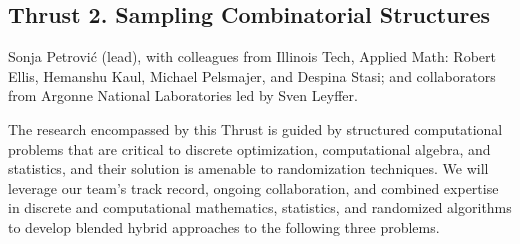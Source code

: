 \documentclass[11pt]{NSFamsart}
\begin{document}

\subsection*{Thrust 2. Sampling Combinatorial Structures} 
 Sonja Petrovi\'c (lead),  with colleagues from Illinois Tech, Applied Math: 
 Robert Ellis,
  Hemanshu Kaul, %
 Michael Pelsmajer, %
and  Despina Stasi; %
and collaborators from Argonne National Laboratories led by Sven Leyffer.  

The research encompassed by this Thrust  is guided by 
structured  computational problems that are critical to discrete optimization, computational algebra, and statistics, and their solution is amenable to randomization techniques. 
We will leverage our team's track record, ongoing collaboration, and  combined expertise in discrete and computational mathematics, statistics, and randomized algorithms to develop  blended hybrid approaches to the following three  problems. 
\end{document}
